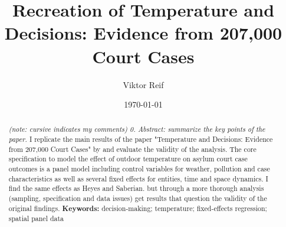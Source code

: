 \documentclass[11pt]{article}
\title{Recreation of Temperature and Decisions: Evidence from 207,000
	Court Cases}
\author{Viktor Reif}
\date{\today}
\begin{document}
	\maketitle
	
	
	\begin{abstract}
		\singlespacing
		\noindent 
		\textit{(note: cursive indicates my comments) 0. Abstract: summarize the key points of the paper.}
		I replicate the main results of the paper "Temperature and Decisions: Evidence from 207,000 Court Cases" by \citealp{Heyes.2019} and evaluate the validity of the analysis. The core specification to model the effect of outdoor temperature on asylum court case outcomes is a panel model including control variables for weather, pollution and case characteristics as well as several fixed effects for entities, time and space dynamics. I find the same effects as Heyes and Saberian. but through a more thorough analysis (sampling, specification and data issues) get results that question the validity of the original findings.
		\newline \noindent \textbf{Keywords:} decision-making; temperature; fixed-effects regression; spatial panel data
	\end{abstract} \newpage
	
	
	
	
\end{document}
